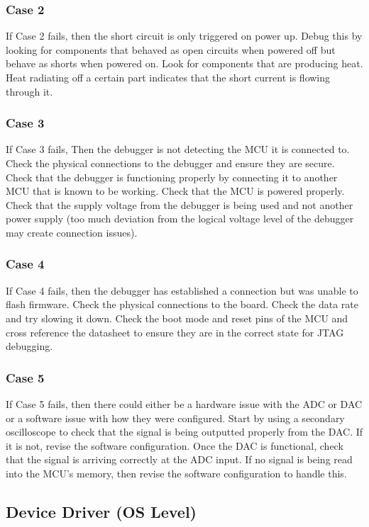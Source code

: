 \documentclass[letterpaper,12pt]{article}
\begin{document}
\subsubsection{Case 2}
If Case 2 fails, then the short circuit is only triggered on power up. Debug
this by looking for components that behaved as open circuits when powered off
but behave as shorts when powered on. Look for components that are producing
heat. Heat radiating off a certain part indicates that the short current is
flowing through it.

\subsubsection{Case 3}
If Case 3 fails, Then the debugger is not detecting the MCU it is connected to.
Check the physical connections to the debugger and ensure they are secure. Check
that the debugger is functioning properly by connecting it to another MCU that
is known to be working. Check that the MCU is powered properly. Check that the
supply voltage from the debugger is being used and not another power supply (too
much deviation from the logical voltage level of the debugger may create
connection issues).

\subsubsection{Case 4}
If Case 4 fails, then the debugger has established a connection but was unable
to flash firmware. Check the physical connections to the board. Check the data
rate and try slowing it down. Check the boot mode and reset pins of the MCU and
cross reference the datasheet to ensure they are in the correct state for JTAG
debugging.

\subsubsection{Case 5}
If Case 5 fails, then there could either be a hardware issue with the ADC or DAC
or a software issue with how they were configured. Start by using a secondary
oscilloscope to check that the signal is being outputted properly from the DAC.
If it is not, revise the software configuration. Once the DAC is functional,
check that the signal is arriving correctly at the ADC input. If no signal is
being read into the MCU's memory, then revise the software configuration to
handle this.

\subsection{Device Driver (OS Level)} %
\end{document}
